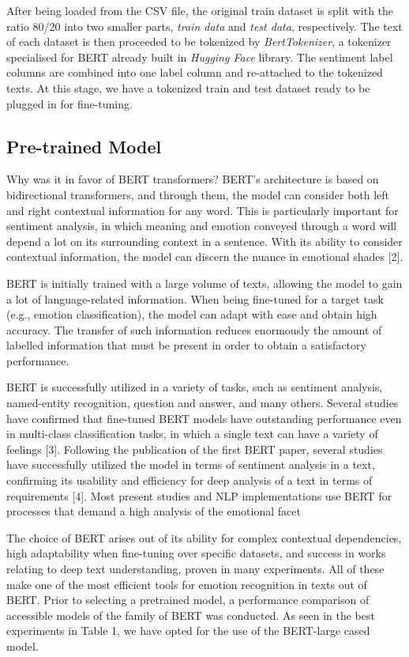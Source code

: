 \documentclass[11pt]{article}
\begin{document}
After being loaded from the CSV file, the original train dataset is split with the ratio 80/20 into two smaller parts, \textit{train data} and \textit{test data}, respectively. The text of each dataset is then proceeded to be tokenized by \textit{BertTokenizer}, a tokenizer specialised for BERT already built in \textit{Hugging Face} library. The sentiment label columns are combined into one label column and re-attached to the tokenized texts. At this stage, we have a tokenized train and test dataset ready to be plugged in for fine-tuning.
\subsection{Pre-trained Model}
Why was it in favor of BERT transformers? BERT's architecture is based on bidirectional transformers, and through them, the model can consider both left and right contextual information for any word. This is particularly important for sentiment analysis, in which meaning and emotion conveyed through a word will depend a lot on its surrounding context in a sentence. With its ability to consider contextual information, the model can discern the nuance in emotional shades [2].

BERT is initially trained with a large volume of texts, allowing the model to gain a lot of language-related information. When being fine-tuned for a target task (e.g., emotion classification), the model can adapt with ease and obtain high accuracy. The transfer of such information reduces enormously the amount of labelled information that must be present in order to obtain a satisfactory performance.

BERT is successfully utilized in a variety of tasks, such as sentiment analysis, named-entity recognition, question and answer, and many others. Several studies have confirmed that fine-tuned BERT models have outstanding performance even in multi-class classification tasks, in which a single text can have a variety of feelings [3]. Following the publication of the first BERT paper, several studies have successfully utilized the model in terms of sentiment analysis in a text, confirming its usability and efficiency for deep analysis of a text in terms of requirements [4]. Most present studies and NLP implementations use BERT for processes that demand a high analysis of the emotional facet

The choice of BERT arises out of its ability for complex contextual dependencies, high adaptability when fine-tuning over specific datasets, and success in works relating to deep text understanding, proven in many experiments. All of these make one of the most efficient tools for emotion recognition in texts out of BERT.
Prior to selecting a pretrained model, a performance comparison of accessible models of the family of BERT was conducted. As seen in the best experiments in Table 1, we have opted for the use of the BERT-large cased model.
\end{document}
